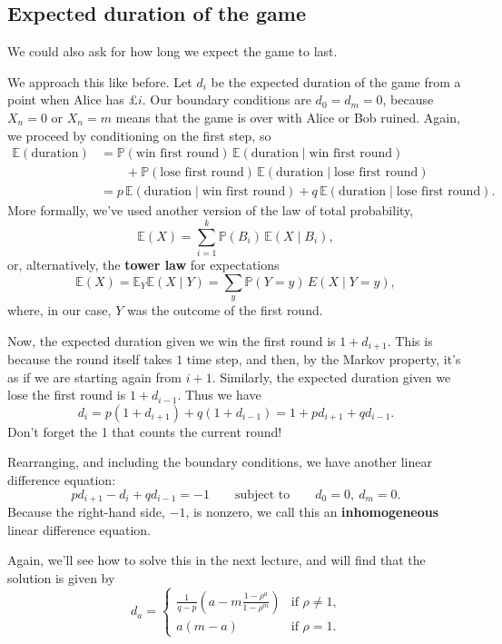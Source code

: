 \documentclass[
  a4paper,
]{article}
\theoremstyle{definition}
\theoremstyle{definition}
\theoremstyle{definition}
\theoremstyle{remark}
\begin{document}
\hypertarget{expected-duration}{%
\subsection{Expected duration of the game}\label{expected-duration}}

We could also ask for how long we expect the game to last.

We approach this like before. Let \(d_i\) be the expected duration of the game from a point when Alice has £\(i\). Our boundary conditions are \(d_0 = d_m = 0\), because \(X_n = 0\) or \(X_n = m\) means that the game is over with Alice or Bob ruined. Again, we proceed by conditioning on the first step, so
\begin{align*}
\mathbb E(\text{duration}) &= \mathbb P(\text{win first round}) \, \mathbb E(\text{duration} \mid \text{win first round}) \\
&\qquad{}+ \mathbb P(\text{lose first round}) \, \mathbb E(\text{duration} \mid \text{lose first round}) \\
&= p\,\mathbb E(\text{duration} \mid \text{win first round}) + q \,\mathbb E(\text{duration} \mid \text{lose first round}) .
\end{align*}
More formally, we've used another version of the law of total probability,
\[ \mathbb E(X) = \sum_{i=1}^k \mathbb P(B_i) \, \mathbb E(X \mid B_i) , \]
or, alternatively, the \textbf{tower law} for expectations
\[ \mathbb E(X) = \mathbb E_Y \mathbb E (X \mid Y) = \sum_{y} \mathbb P(Y= y)\, E(X \mid Y = y), \]
where, in our case, \(Y\) was the outcome of the first round.

Now, the expected duration given we win the first round is \(1 + d_{i+1}\). This is because the round itself takes \(1\) time step, and then, by the Markov property, it's as if we are starting again from \(i+1\). Similarly, the expected duration given we lose the first round is \(1 + d_{i-1}\). Thus we have
\[ d_i = p(1 + d_{i+1}) + q (1 + d_{i-1}) = 1 + pd_{i+1} + qd_{i-1} . \]
Don't forget the 1 that counts the current round!

Rearranging, and including the boundary conditions, we have another linear difference equation:
\[ pd_{i+1} - d_i + qd_{i-1} = -1 \qquad \text{subject to} \qquad d_0 = 0,\ d_m = 0. \]
Because the right-hand side, \(-1\), is nonzero, we call this an \textbf{inhomogeneous} linear difference equation.

Again, we'll see how to solve this in the next lecture, and will find that the solution is given by
\[ d_a = \begin{cases} {\displaystyle \frac{1}{q-p} \left(a - m\frac{1-\rho^a}{1- \rho^m} \right)} & \text{if $\rho \neq 1$,} \\
\displaystyle a(m-a) & \text{if $\rho = 1$.} \end{cases} \]
\end{document}
